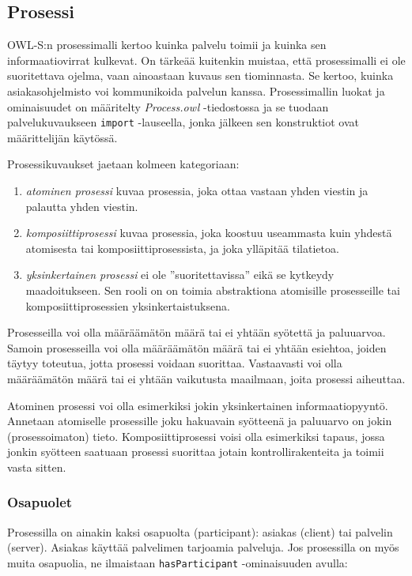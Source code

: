 \documentclass[finnish]{tktltiki2}
\theoremstyle{definition}
\theoremstyle{remark}
\begin{document}
\subsection{Prosessi}

OWL-S:n prosessimalli kertoo kuinka palvelu toimii ja kuinka sen informaatiovirrat kulkevat.  On tärkeää kuitenkin muistaa, että prosessimalli ei ole suoritettava ojelma, vaan ainoastaan kuvaus sen tiominnasta\cite{OWLS}. Se kertoo, kuinka asiakasohjelmisto voi kommunikoida palvelun kanssa. Prosessimallin luokat ja ominaisuudet on määritelty \textit{Process.owl} -tiedostossa ja se tuodaan palvelukuvaukseen \texttt{import} -lauseella, jonka jälkeen sen konstruktiot ovat määrittelijän käytössä. 

Prosessikuvaukset jaetaan kolmeen kategoriaan\cite{OWLS}:

\begin{enumerate}
\item \textit{atominen prosessi} kuvaa prosessia, joka ottaa vastaan yhden viestin ja palautta yhden viestin. 
\item \textit{komposiittiprosessi} kuvaa prosessia, joka koostuu useammasta kuin yhdestä atomisesta  tai komposiittiprosessista, ja joka ylläpitää tilatietoa. 
\item \textit{yksinkertainen prosessi} ei ole ''suoritettavissa'' eikä se kytkeydy maadoitukseen. Sen rooli on on toimia abstraktiona atomisille prosesseille tai komposiittiprosessien yksinkertaistuksena. 
\end{enumerate}

Prosesseilla voi olla määräämätön määrä tai ei yhtään syötettä ja paluuarvoa. Samoin prosesseilla voi olla määräämätön määrä tai ei yhtään  esiehtoa, joiden täytyy toteutua, jotta prosessi voidaan suorittaa. Vastaavasti voi olla määräämätön määrä tai ei yhtään vaikutusta maailmaan, joita prosessi aiheuttaa\cite{OWLS}.

Atominen prosessi voi olla esimerkiksi jokin yksinkertainen informaatiopyyntö. Annetaan atomiselle prosessille joku hakuavain syötteenä ja paluuarvo on jokin (prosessoimaton) tieto.  Komposiittiprosessi voisi olla esimerkiksi tapaus, jossa jonkin syötteen saatuaan prosessi suorittaa jotain kontrollirakenteita ja toimii vasta sitten. 


\subsubsection{Osapuolet}

Prosessilla on ainakin kaksi osapuolta (participant): asiakas (client) tai palvelin (server). Asiakas käyttää palvelimen tarjoamia palveluja\cite{OWLS}.
Jos prosessilla on myös muita osapuolia, ne ilmaistaan \texttt{hasParticipant} -ominaisuuden avulla:
\end{document}
